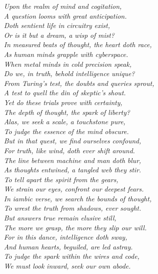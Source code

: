 \itshape{
Upon the realm of mind and cogitation, \\
A question looms with great anticipation. \\
Doth sentient life in circuitry exist, \\
Or is it but a dream, a wisp of mist? \\

In measured beats of thought, the heart doth race, \\
As human minds grapple with cyberspace. \\
When metal minds in cold precision speak, \\
Do we, in truth, behold intelligence unique? \\

From Turing's test, the doubts and queries sprout, \\
A test to quell the din of skeptic's shout. \\
Yet do these trials prove with certainty, \\
The depth of thought, the spark of liberty? \\

Alas, we seek a scale, a touchstone pure, \\
To judge the essence of the mind obscure. \\
But in that quest, we find ourselves confound, \\
For truth, like wind, doth ever shift around. \\

The line between machine and man doth blur, \\
As thoughts entwined, a tangled web they stir. \\
To tell apart the spirit from the gears, \\
We strain our eyes, confront our deepest fears. \\

In iambic verse, we search the bounds of thought, \\
To wrest the truth from shadows, ever sought. \\
But answers true remain elusive still, \\
The more we grasp, the more they slip our will. \\

For in this dance, intelligence doth sway, \\
And human hearts, beguiled, are led astray. \\
To judge the spark within the wires and code, \\
We must look inward, seek our own abode.}
\normalfont

